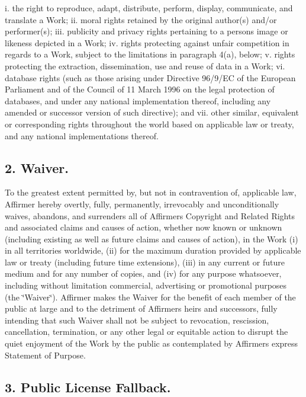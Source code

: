 i. the right to reproduce, adapt, distribute, perform, display, communicate, and translate a Work; ii. moral rights retained by the original author(s) and/or performer(s); iii. publicity and privacy rights pertaining to a person\textquotesingle{}s image or likeness depicted in a Work; iv. rights protecting against unfair competition in regards to a Work, subject to the limitations in paragraph 4(a), below; v. rights protecting the extraction, dissemination, use and reuse of data in a Work; vi. database rights (such as those arising under Directive 96/9/\+EC of the European Parliament and of the Council of 11 March 1996 on the legal protection of databases, and under any national implementation thereof, including any amended or successor version of such directive); and vii. other similar, equivalent or corresponding rights throughout the world based on applicable law or treaty, and any national implementations thereof.

\subsection*{2. Waiver. }

To the greatest extent permitted by, but not in contravention of, applicable law, Affirmer hereby overtly, fully, permanently, irrevocably and unconditionally waives, abandons, and surrenders all of Affirmer\textquotesingle{}s Copyright and Related Rights and associated claims and causes of action, whether now known or unknown (including existing as well as future claims and causes of action), in the Work (i) in all territories worldwide, (ii) for the maximum duration provided by applicable law or treaty (including future time extensions), (iii) in any current or future medium and for any number of copies, and (iv) for any purpose whatsoever, including without limitation commercial, advertising or promotional purposes (the \char`\"{}\+Waiver\char`\"{}). Affirmer makes the Waiver for the benefit of each member of the public at large and to the detriment of Affirmer\textquotesingle{}s heirs and successors, fully intending that such Waiver shall not be subject to revocation, rescission, cancellation, termination, or any other legal or equitable action to disrupt the quiet enjoyment of the Work by the public as contemplated by Affirmer\textquotesingle{}s express Statement of Purpose.

\subsection*{3. Public License Fallback. }

